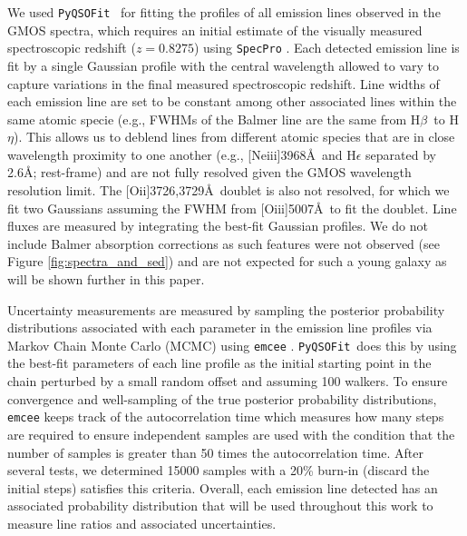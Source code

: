 \documentclass[twocolumn,tight,times,linenumbers]{aastex631}
\newcommand{\hbeta}{H$\beta$}
\newcommand{\oii}{[O{\sc ii}]}
\newcommand{\oiii}{[O{\sc iii}]}
\newcommand{\neiii}{[Ne{\sc iii}]}
\newcommand{\pyqsofit}{\texttt{PyQSOFit}}
\begin{document}
		We used \pyqsofit~\citep{Guo2018} for fitting the profiles of all emission lines observed in the GMOS spectra, which requires an initial estimate of the visually measured spectroscopic redshift ($z = 0.8275$) using \verb|SpecPro| \citep{Masters2011}. Each detected emission line is fit by a single Gaussian profile with the central wavelength allowed to vary to capture variations in the final measured spectroscopic redshift. Line widths of each emission line are set to be constant among other associated lines within the same atomic specie (e.g., FWHMs of the Balmer line are the same from \hbeta~to H$\eta$). This allows us to deblend lines from different atomic species that are in close wavelength proximity to one another (e.g., \neiii3968\AA~and H$\epsilon$ separated by 2.6\AA; rest-frame) and are not fully resolved given the GMOS wavelength resolution limit. The \oii3726,3729\AA~doublet is also not resolved, for which we fit two Gaussians assuming the FWHM from \oiii5007\AA~to fit the doublet. Line fluxes are measured by integrating the best-fit Gaussian profiles. We do not include Balmer absorption corrections as such features were not observed (see Figure \ref{fig:spectra_and_sed}) and are not expected for such a young galaxy as will be shown further in this paper.
		
		
		Uncertainty measurements are measured by sampling the posterior probability distributions associated with each parameter in the emission line profiles via Markov Chain Monte Carlo (MCMC) using \texttt{emcee} \citep{Foreman2013}. \pyqsofit~does this by using the best-fit parameters of each line profile as the initial starting point in the chain perturbed by a small random offset and assuming 100 walkers. To ensure convergence and well-sampling of the true posterior probability distributions, \texttt{emcee} keeps track of the autocorrelation time which measures how many steps are required to ensure independent samples are used with the condition that the number of samples is greater than 50 times the autocorrelation time.  After several tests, we determined 15000 samples with a 20\% burn-in (discard the initial steps) satisfies this criteria. Overall, each emission line detected has an associated probability distribution that will be used throughout this work to measure line ratios and associated uncertainties.
	
\end{document}

